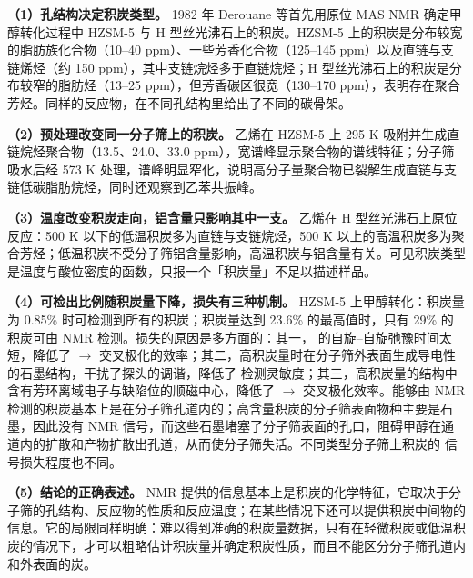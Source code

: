 \begin{dataflow}
\textbf{（1）孔结构决定积炭类型。} 1982 年 Derouane 等首先用原位  MAS NMR 确定甲醇转化过程中 HZSM-5 与 H 型丝光沸石上的积炭。HZSM-5 上的积炭是分布较宽的脂肪族化合物（10--40 ppm）、一些芳香化合物（125--145 ppm）以及直链与支链烯烃（约 150 ppm），其中支链烷烃多于直链烷烃；H 型丝光沸石上的积炭是分布较窄的脂肪烃（13--25 ppm），但芳香碳区很宽（130--170 ppm），表明存在聚合芳烃。同样的反应物，在不同孔结构里给出了不同的碳骨架。

\textbf{（2）预处理改变同一分子筛上的积炭。} 乙烯在 HZSM-5 上 295 K 吸附并生成直链烷烃聚合物（13.5、24.0、33.0 ppm），宽谱峰显示聚合物的谱线特征；分子筛吸水后经 573 K 处理，谱峰明显窄化，说明高分子量聚合物已裂解生成直链与支链低碳脂肪烷烃，同时还观察到乙苯共振峰。

\textbf{（3）温度改变积炭走向，铝含量只影响其中一支。} 乙烯在 H 型丝光沸石上原位反应：500 K 以下的低温积炭多为直链与支链烷烃，500 K 以上的高温积炭多为聚合芳烃；低温积炭不受分子筛铝含量影响，高温积炭与铝含量有关。可见积炭类型是温度与酸位密度的函数，只报一个「积炭量」不足以描述样品。

\textbf{（4）可检出比例随积炭量下降，损失有三种机制。} HZSM-5 上甲醇转化：积炭量为 0.85\% 时可检测到所有的积炭；积炭量达到 23.6\% 的最高值时，只有 29\% 的积炭可由 NMR 检测。损失的原因是多方面的：其一， 的自旋--自旋弛豫时间太短，降低了 $\rightarrow$ 交叉极化的效率；其二，高积炭量时在分子筛外表面生成导电性的石墨结构，干扰了探头的调谐，降低了  检测灵敏度；其三，高积炭量的结构中含有芳环离域电子与缺陷位的顺磁中心，降低了 $\rightarrow$ 交叉极化效率。能够由 NMR 检测的积炭基本上是在分子筛孔道内的；高含量积炭的分子筛表面物种主要是石墨，因此没有 NMR 信号，而这些石墨堵塞了分子筛表面的孔口，阻碍甲醇在通道内的扩散和产物扩散出孔道，从而使分子筛失活。不同类型分子筛上积炭的  信号损失程度也不同。

\textbf{（5）结论的正确表述。}  NMR 提供的信息基本上是积炭的化学特征，它取决于分子筛的孔结构、反应物的性质和反应温度；在某些情况下还可以提供积炭中间物的信息。它的局限同样明确：难以得到准确的积炭量数据，只有在轻微积炭或低温积炭的情况下，才可以粗略估计积炭量并确定积炭性质，而且不能区分分子筛孔道内和外表面的炭。
\end{dataflow}

